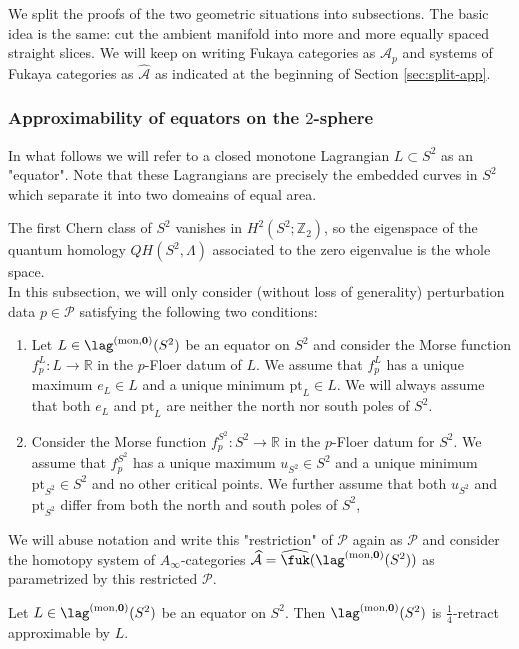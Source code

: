 

	We split the proofs of the two geometric situations into subsections. The basic idea is the same: cut the ambient manifold into more and more equally spaced straight slices. We will keep on writing Fukaya categories as $\mathcal{A}_p$ and systems of Fukaya categories as $\widehat{\mathcal{A}}$ as indicated at the beginning of Section \ref{sec:split-app}.
\subsubsection{Approximability of equators on the $2$-sphere} In what follows we will refer to a closed monotone Lagrangian $L\subset S^2$ as an "equator". Note that these Lagrangians are precisely the embedded curves in $S^2$ which separate it into two domeains of equal area.

The first Chern class of $S^2$ vanishes in $H^2(S^2;\mathbb{Z}_2)$, so the eigenspace of the quantum homology $QH(S^2,\Lambda)$ associated to the zero eigenvalue is the whole space. \\ In this subsection, we will only consider (without loss of generality) perturbation data $p\in \mathcal{P}$ satisfying the following two conditions:
\begin{enumerate}
	\item Let $L\in \lag^{\text{(mon,} \mathbf{0} \text{)}}(S^2)$ be an equator on $S^2$ and consider the Morse function $f^L_p\colon L\to \mathbb{R}$ in the $p$-Floer datum of $L$. We assume that $f^L_p$ has a unique maximum $e_L\in L$ and a unique minimum $\text{pt}_L\in L$. We will always assume that both $e_L$ and $\text{pt}_L$ are neither the north nor south poles of $S^2$.
	\item Consider the Morse function $f^{S^2}_p\colon S^2\to \mathbb R$ in the $p$-Floer datum for $S^2$. We assume that $f^{S^2}_p$ has a unique maximum $u_{S^2}\in S^2$ and a unique minimum $\text{pt}_{S^2}\in S^2$ and no other critical points. We further assume that both $u_{S^2}$ and $\text{pt}_{S^2}$ differ from both the north and south poles of $S^2$, 
\end{enumerate}
We will abuse notation and write this "restriction" of $\mathcal{P}$ again as $\mathcal{P}$ and consider the homotopy system of $A_\infty$-categories $\widehat{\mathcal{A}}= \widehat{\fuk}(\lag^{\text{(mon,} \mathbf{0} \text{)}}(S^2))$ as parametrized by this restricted $\mathcal{P}$.
\begin{prop}\label{singlelagsphere}
	Let $L\in \lag^{\text{(mon,} \mathbf{0} \text{)}}(S^2)$ be an equator on $S^2$. Then $\lag^{\text{(mon,} \mathbf{0} \text{)}}(S^2)$ is $\frac{1}{4}$-retract approximable by $L$.
\end{prop}

